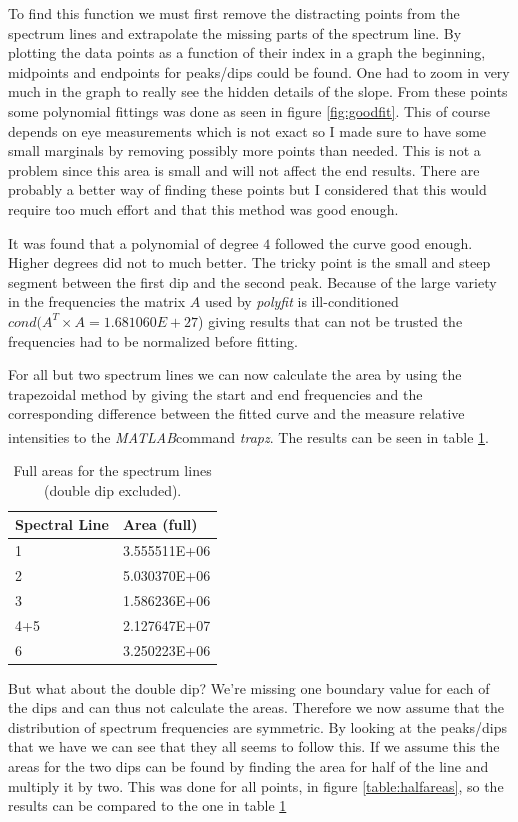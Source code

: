\documentclass[10pt, a4paper]{article}
\newcommand{\matlab}{\small{\emph{MATLAB\textsuperscript{\textregistered}}}}
\begin{document}
To find this function we must first remove the distracting points from the spectrum lines and extrapolate the missing parts of the spectrum line. By plotting the data points as a function of their index in a graph the beginning, midpoints and endpoints for peaks/dips could be found. One had to zoom in very much in the graph to really see the hidden details of the slope. From these points some polynomial fittings was done as seen in figure \ref{fig:goodfit}. This of course depends on eye measurements which is not exact so I made sure to have some small marginals by removing possibly more points than needed. This is not a problem since this area is small and will not affect the end results. There are probably a better way of finding these points but I considered that this would require too much effort and that this method was good enough.

It was found that a polynomial of degree $4$ followed the curve good enough. Higher degrees did not to much better. The tricky point is the small and steep segment between the first dip and the second peak. Because of the large variety in the frequencies the matrix $A$ used by \emph{polyfit} is ill-conditioned $cond(A^T\times A=1.681060E+27$) giving results that can not be trusted the frequencies had to be normalized before fitting.

For all but two spectrum lines we can now calculate the area by using the trapezoidal method by giving the start and end frequencies and the corresponding difference between the fitted curve and the measure relative intensities to the \matlab command \emph{trapz}. The results can be seen in table \ref{table:areas}.

\begin{table}[h]
\begin{center}
\begin{tabular}{l | l}
Spectral Line & Area (full) \\ \hline
1   & 3.555511E+06 \\
2   & 5.030370E+06 \\
3   & 1.586236E+06 \\
4+5 & 2.127647E+07 \\
6   & 3.250223E+06
\end{tabular}
\end{center}
\caption{Full areas for the spectrum lines (double dip excluded).}
\label{table:areas}
\end{table}

But what about the double dip? We're missing one boundary value for each of the dips and can thus not calculate the areas. Therefore we now assume that the distribution of spectrum frequencies are symmetric. By looking at the peaks/dips that we have we can see that they all seems to follow this. If we assume this the areas for the two dips can be found by finding the area for half of the line and multiply it by two. This was done for all points, in figure \ref{table:halfareas}, so the results can be compared to the one in table \ref{table:areas} 
\end{document}
